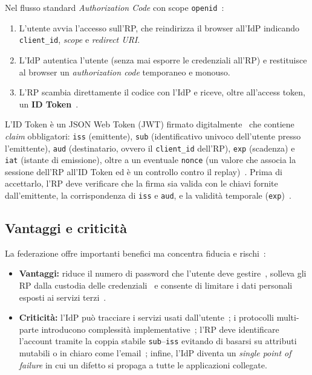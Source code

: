 Nel flusso standard \emph{Authorization Code} con scope \texttt{openid}~\cite{rfc6749,openid-connect-core}:
\begin{enumerate}
    \item L'utente avvia l'accesso sull'RP, che reindirizza il browser all'IdP indicando \texttt{client\_id}, \emph{scope} e \emph{redirect URI}.
    \item L'IdP autentica l'utente (senza mai esporre le credenziali all'RP) e restituisce al browser un \emph{authorization code} temporaneo e monouso.
    \item L'RP scambia direttamente il codice con l'IdP e riceve, oltre all'access token, un \textbf{ID Token}~\cite{openid-connect-core}.
\end{enumerate}
L'ID Token è un JSON Web Token (JWT) firmato digitalmente~\cite{rfc7519} che contiene \emph{claim} obbligatori: \texttt{iss} (emittente), \texttt{sub} (identificativo univoco dell'utente presso l'emittente), \texttt{aud} (destinatario, ovvero il \texttt{client\_id} dell'RP), \texttt{exp} (scadenza) e \texttt{iat} (istante di emissione), oltre a un eventuale \texttt{nonce} (un valore che associa la sessione dell'RP all'ID Token ed è un controllo contro il replay)~\cite{openid-connect-core}. Prima di accettarlo, l'RP deve verificare che la firma sia valida con le chiavi fornite dall'emittente, la corrispondenza di \texttt{iss} e \texttt{aud}, e la validità temporale (\texttt{exp})~\cite{openid-connect-core}.

\subsection{Vantaggi e criticità}
La federazione offre importanti benefici ma concentra fiducia e rischi~\cite{nist800-63-3-impl,nist800-63c-4-privacy,nist800-63c-4-fed}:
\begin{itemize}
    \item \textbf{Vantaggi:} riduce il numero di password che l'utente deve gestire~\cite{nist800-63-3-impl}, solleva gli RP dalla custodia delle credenziali~\cite{rfc6749} e consente di limitare i dati personali esposti ai servizi terzi~\cite{nist800-63c-4-privacy}.
    \item \textbf{Criticità:} l'IdP può tracciare i servizi usati dall'utente~\cite{nist800-63c-4-privacy}; i protocolli multi-parte introducono complessità implementative~\cite{nist800-63c-4-fed}; l'RP deve identificare l'account tramite la coppia stabile \texttt{sub}--\texttt{iss} evitando di basarsi su attributi mutabili o in chiaro come l'email~\cite{nist800-63c-4-fed}; infine, l'IdP diventa un \emph{single point of failure} in cui un difetto si propaga a tutte le applicazioni collegate.
\end{itemize}
